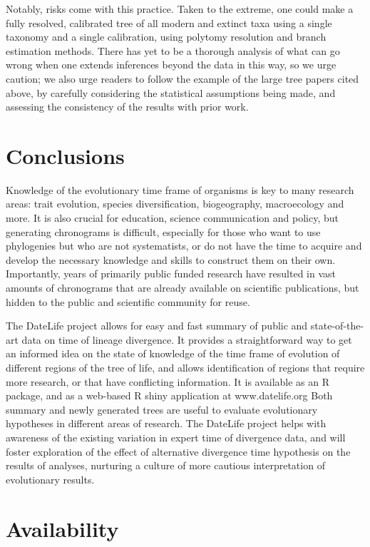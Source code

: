 \documentclass[
  english,
  man]{apa6}
\begin{document}
Notably, risks come with this practice.
Taken to the extreme, one could make a fully resolved, calibrated tree of all modern and extinct taxa using a single taxonomy and a single calibration, using polytomy resolution and branch estimation methods.
There has yet to be a thorough analysis of what can go wrong when one extends inferences beyond the data in this way, so we urge caution; we also urge readers to follow the example of the large tree papers cited above, by carefully considering the statistical assumptions being made, and assessing the consistency of the results with prior work.

\hypertarget{conclusions}{%
\section{Conclusions}\label{conclusions}}

Knowledge of the evolutionary time frame of organisms is key to many research areas: trait evolution,
species diversification, biogeography, macroecology and more. It is also crucial for education, science communication and policy, but generating chronograms is difficult,
especially for those who want to use phylogenies but who are not systematists, or
do not have the time to acquire and develop the necessary knowledge and skills to construct them on their own. Importantly, years of primarily public funded research have resulted in vast amounts of chronograms that are already available on scientific publications, but hidden to the public and scientific community for reuse.

The DateLife project allows for easy and fast summary of public and state-of-the-art data on time of lineage divergence.
It provides a straightforward way to get an informed idea on the state of knowledge of the time frame of evolution of different regions of the tree of life, and allows identification of regions that require more research, or that have conflicting information.
It is available as an R package, and as a web-based R shiny application at www.datelife.org
Both summary and newly generated trees are useful to evaluate evolutionary hypotheses in different areas of research. The DateLife project helps with awareness of the existing variation in expert time of divergence data, and will foster exploration of the effect of alternative divergence time hypothesis on the results of analyses, nurturing a culture of more cautious interpretation of evolutionary results.

\hypertarget{availability}{%
\section{Availability}\label{availability}}
\end{document}
